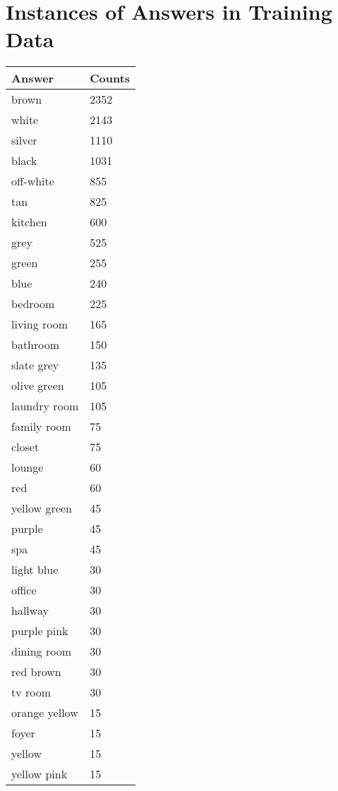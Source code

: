 \section{Instances of Answers in Training Data}
\label{app:answercounts}
\begin{table}[h!]
\centering
\begin{adjustbox}{totalheight=.65\textheight}
\begin{tabular}{|l|l|}
\hline
Answer & Counts \\
\hline
brown            & 2352 \\
white            & 2143 \\
silver           & 1110 \\
black            & 1031 \\
off-white        & 855 \\
tan              & 825 \\
kitchen          & 600 \\
grey             & 525 \\
green            & 255 \\
blue             & 240 \\
bedroom          & 225 \\
living room      & 165 \\
bathroom         & 150 \\
slate grey       & 135 \\
olive green      & 105 \\
laundry room     & 105 \\
family room      & 75 \\
closet           & 75 \\
lounge           & 60 \\
red              & 60 \\
yellow green     & 45 \\
purple           & 45 \\
spa              & 45 \\
light blue       & 30 \\
office           & 30 \\
hallway          & 30 \\
purple pink      & 30 \\
dining room      & 30 \\
red brown        & 30 \\
tv room          & 30 \\
orange yellow    & 15 \\
foyer            & 15 \\
yellow           & 15 \\
yellow pink      & 15 \\

\hline
\end{tabular}
\end{adjustbox}
\end{table}
